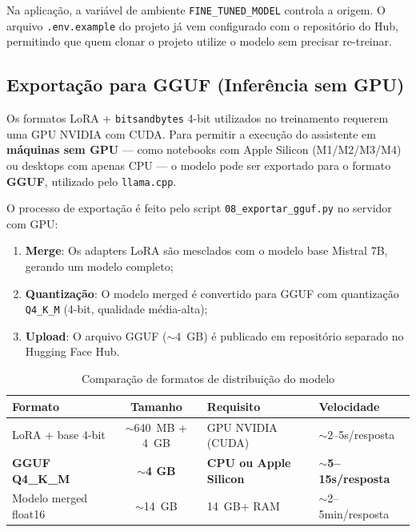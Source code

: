 Na aplicação, a variável de ambiente \texttt{FINE\_TUNED\_MODEL} controla a origem. O arquivo \texttt{.env.example} do projeto já vem configurado com o repositório do Hub, permitindo que quem clonar o projeto utilize o modelo sem precisar re-treinar.

\subsection{Exportação para GGUF (Inferência sem GPU)}
\label{subsec:gguf}

Os formatos LoRA + \texttt{bitsandbytes} 4-bit utilizados no treinamento requerem uma GPU NVIDIA com CUDA. Para permitir a execução do assistente em \textbf{máquinas sem GPU} --- como notebooks com Apple Silicon (M1/M2/M3/M4) ou desktops com apenas CPU --- o modelo pode ser exportado para o formato \textbf{GGUF}, utilizado pelo \texttt{llama.cpp}.

O processo de exportação é feito pelo script \texttt{08\_exportar\_gguf.py} no servidor com GPU:

\begin{enumerate}
    \item \textbf{Merge}: Os adapters LoRA são mesclados com o modelo base Mistral 7B, gerando um modelo completo;
    \item \textbf{Quantização}: O modelo merged é convertido para GGUF com quantização \texttt{Q4\_K\_M} (4-bit, qualidade média-alta);
    \item \textbf{Upload}: O arquivo GGUF ($\sim$4~GB) é publicado em repositório separado no Hugging Face Hub.
\end{enumerate}

\begin{table}[H]
\centering
\caption{Comparação de formatos de distribuição do modelo}
\label{tab:formatos-modelo}
\begin{tabular}{lcll}
\toprule
\textbf{Formato} & \textbf{Tamanho} & \textbf{Requisito} & \textbf{Velocidade} \\
\midrule
LoRA + base 4-bit & $\sim$640~MB + 4~GB & GPU NVIDIA (CUDA) & $\sim$2--5s/resposta \\
\textbf{GGUF Q4\_K\_M} & \textbf{$\sim$4 GB} & \textbf{CPU ou Apple Silicon} & \textbf{$\sim$5--15s/resposta} \\
Modelo merged float16 & $\sim$14~GB & 14~GB+ RAM & $\sim$2--5min/resposta \\
\bottomrule
\end{tabular}
\end{table}

